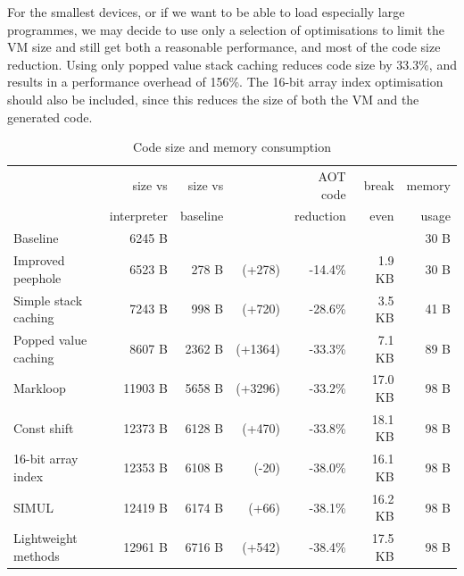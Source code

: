 For the smallest devices, or if we want to be able to load especially large programmes, we may decide to use only a selection of optimisations to limit the VM size and still get both a reasonable performance, and most of the code size reduction. Using only popped value stack caching reduces code size by 33.3\%, and results in a performance overhead of 156\%. The  16-bit array index optimisation should also be included, since this reduces the size of both the VM and the generated code.

\begin{table}[]

\centering
\caption{Code size and memory consumption}
\label{tbl-code-size-and-memory-consumption}
\small
\begin{tabular}{lrrrrrr}
\toprule
                      & size vs     & size vs  &            & AOT code  & break   & memory \\
                      & interpreter & baseline &            & reduction & even    & usage  \\
\hline
Baseline              &     6245 B  &          &            &           &         & 30 B   \\
Improved peephole     &     6523 B  &    278 B &  \scriptsize (+278)  &  -14.4\%  &  1.9 KB & 30 B   \\
Simple stack caching  &     7243 B  &    998 B &  \scriptsize (+720)  &  -28.6\%  &  3.5 KB & 41 B   \\
Popped value caching  &     8607 B  &   2362 B & \scriptsize (+1364)  &  -33.3\%  &  7.1 KB & 89 B   \\
Markloop              &    11903 B  &   5658 B & \scriptsize (+3296)  &  -33.2\%  & 17.0 KB & 98 B   \\
Const shift           &    12373 B  &   6128 B &  \scriptsize (+470)  &  -33.8\%  & 18.1 KB & 98 B   \\
16-bit array index    &    12353 B  &   6108 B &   \scriptsize (-20)  &  -38.0\%  & 16.1 KB & 98 B   \\
SIMUL                 &    12419 B  &   6174 B &   \scriptsize (+66)  &  -38.1\%  & 16.2 KB & 98 B   \\
Lightweight methods   &    12961 B  &   6716 B &  \scriptsize (+542)  &  -38.4\%  & 17.5 KB & 98 B   \\
\bottomrule
\end{tabular}
\end{table}


